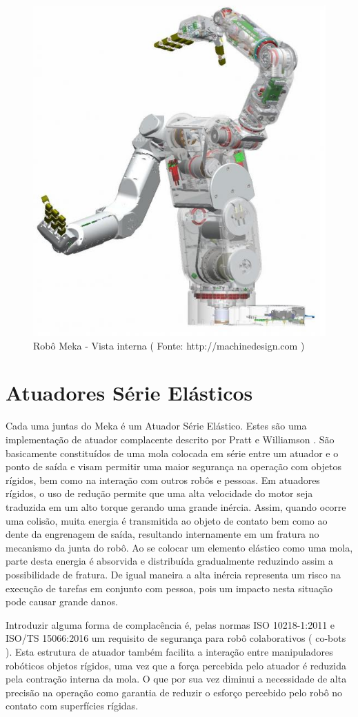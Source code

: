 \begin{figure}[H]
    \centering
    \includegraphics[width = 0.6\linewidth]{tex/figs/meka-inside.png}
    \caption{Robô Meka - Vista interna ( Fonte:  http://machinedesign.com )}
    \label{fig:meka-inside}
\end{figure}

\section{Atuadores Série Elásticos}

Cada uma juntas do Meka é um Atuador Série Elástico. Estes são uma implementação de atuador complacente descrito por Pratt e Williamson \cite{pratt1995series}. São basicamente constituídos de uma mola colocada em série entre um atuador e o ponto de saída e visam permitir uma maior segurança na operação com objetos rígidos, bem como na interação com outros robôs e pessoas. Em atuadores rígidos, o uso de redução permite que uma alta velocidade do motor seja traduzida em um alto torque gerando uma grande inércia. Assim, quando ocorre uma colisão, muita energia é transmitida ao objeto de contato bem como ao dente da engrenagem de saída, resultando internamente em um fratura no mecanismo da junta do robô. Ao se colocar um elemento elástico como uma mola, parte desta energia é absorvida e distribuída gradualmente reduzindo assim a possibilidade de fratura. De igual maneira a alta inércia representa um risco na execução de tarefas em conjunto com pessoa, pois um impacto nesta situação pode causar grande danos.

Introduzir alguma forma de complacência é, pelas normas ISO 10218-1:2011 e ISO/TS 15066:2016 um requisito de segurança para robô colaborativos ( co-bots ). Esta estrutura de atuador também facilita a interação entre manipuladores robóticos objetos rígidos, uma vez que a força percebida pelo atuador é reduzida pela contração interna da mola. O que por sua vez diminui a necessidade de alta precisão na operação como garantia de reduzir o esforço percebido pelo robô no contato com superfícies rígidas.


